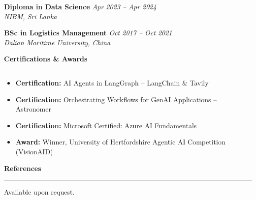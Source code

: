 \documentclass[a4paper,10pt]{article}
\newcommand{\sect}[1]{\vspace{8pt}\noindent\textbf{\color{heading}\large #1}\vspace{3pt}\hrule\vspace{6pt}}
\begin{document}
\noindent\textbf{Diploma in Data Science} \hfill \textit{Apr 2023 -- Apr 2024} \\
\textit{NIBM, Sri Lanka}
\vspace{4pt}

\noindent\textbf{BSc in Logistics Management} \hfill \textit{Oct 2017 -- Oct 2021} \\
\textit{Dalian Maritime University, China}

\sect{Certifications \& Awards}
\begin{itemize}[leftmargin=*, itemsep=0pt, parsep=0pt, topsep=2pt]
    \item \textbf{Certification:} AI Agents in LangGraph -- LangChain \& Tavily
    \item \textbf{Certification:} Orchestrating Workflows for GenAI Applications -- Astronomer
    \item \textbf{Certification:} Microsoft Certified: Azure AI Fundamentals
    \item \textbf{Award:} Winner, University of Hertfordshire Agentic AI Competition (VisionAID)
\end{itemize}

\sect{References}
Available upon request.
\end{document}
